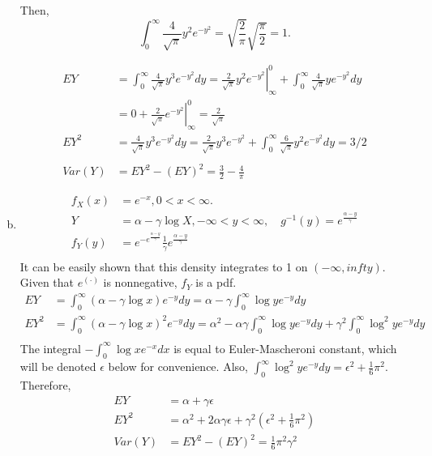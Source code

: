 \documentclass[letter]{article}
\newcommand{\intzi}{\int_0^\infty}
\begin{document}
\begin{enumerate}[(a)]
    Then,
    \[
    \intzi \frac{4}{\sqrt{\pi}} y^2 e^{-y^2} = \sqrt{\frac{2}{\pi}} \sqrt{\frac{\pi}{2}} = 1.
    \]

    \begin{align*}
    EY & = \intzi \frac{4}{\sqrt{\pi}} y^3 e^{-y^2} dy = \left. \frac{2}{\sqrt{\pi}} y^2 e^{-y^2} \right|^0_\infty + \intzi \frac{4}{\sqrt{\pi}} y e^{-y^2} dy \\
    & = 0 + \left. \frac{2}{\sqrt{\pi}} e^{-y^2} \right|^0_\infty = \frac{2}{\sqrt{\pi}} \\
    EY^2 & = \frac{4}{\sqrt{\pi}} y^3 e^{-y^2} dy = \frac{2}{\sqrt{\pi}} y^3 e^{-y^2} + \intzi \frac{6}{\sqrt{\pi}} y^2 e^{-y^2}dy = 3/2\\
    \\
    Var(Y) &= EY^2 - (EY)^2 = \frac{3}{2} - \frac{4}{\pi}
    \end{align*}

    \item 
    \begin{align*}
    f_X(x) & = e^{-x}, 0 < x < \infty.\\
    Y & = \alpha - \gamma\log X, -\infty < y < \infty, \quad g^{-1}(y) = e^{\frac{\alpha-y}{\gamma}}\\
    f_Y(y) &= e^{-e^{\frac{\alpha-y}{\gamma}}} \frac{1}{\gamma} e^{\frac{\alpha-y}{\gamma}}\\
    \end{align*}
    It can be easily shown that this density integrates to 1 on $(-\infty, infty)$. Given that $e^(\cdot)$ is nonnegative, $f_Y$ is a pdf.
    \begin{align*}
    EY & = \intzi (\alpha - \gamma \log x) e^{-y} dy = \alpha - \gamma \intzi \log y e^{-y} dy\\
    EY^2 & = \intzi (\alpha - \gamma \log x)^2 e^{-y} dy = \alpha^2 -\alpha \gamma \intzi \log y e^{-y} dy + \gamma^2 \intzi \log^2 y e^{-y} dy \\
    \end{align*}
    The integral $-\intzi \log x e^{-x} dx$ is equal to Euler-Mascheroni constant, which will be denoted $\epsilon$ below for convenience. Also, $\intzi \log^2 y e^{-y} dy = \epsilon^2 + \frac{1}{6} \pi^2.$
    Therefore,
    \begin{align*}
    EY & = \alpha + \gamma \epsilon \\
    EY^2 & = \alpha^2 + 2\alpha\gamma\epsilon + \gamma^2 (\epsilon^2 + \frac{1}{6} \pi^2)\\
    Var(Y) & = EY^2 - (EY)^2 = \frac{1}{6} \pi^2 \gamma^2
    \end{align*}
    \end{enumerate}
\end{document}
